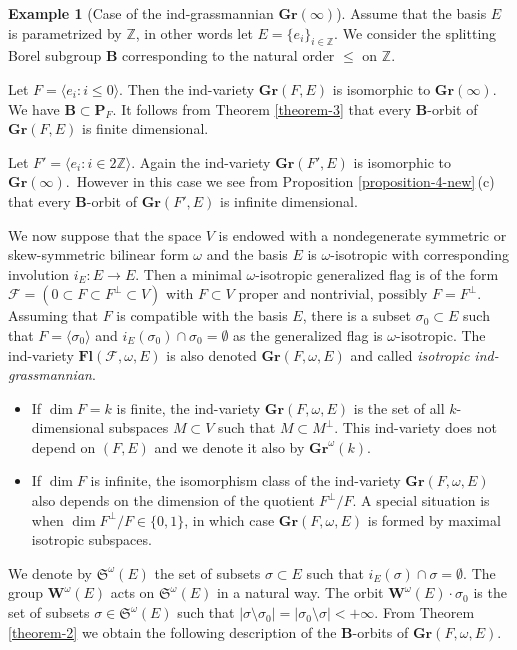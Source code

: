 \documentclass[12pt]{amsart}
\theoremstyle{definition}
\newtheorem{example}{Example}
\begin{document}
\begin{example}[Case of the ind-grassmannian $\mathbf{Gr}(\infty)$]

Assume that the basis $E$ is parametrized by $\mathbb{Z}$, in other words let $E=\{e_i\}_{i\in\mathbb{Z}}$. We consider the splitting Borel subgroup $\mathbf{B}$ corresponding to the natural order $\leq$ on $\mathbb{Z}$.

Let $F=\langle e_i:i\leq 0\rangle$. Then the ind-variety $\mathbf{Gr}(F,E)$ is isomorphic to $\mathbf{Gr}(\infty)$. We have $\mathbf{B}\subset\mathbf{P}_F$. It follows from Theorem \ref{theorem-3} that every $\mathbf{B}$-orbit of $\mathbf{Gr}(F,E)$ is finite dimensional.

Let $F'=\langle e_i:i\in 2\mathbb{Z}\rangle$. Again the ind-variety $\mathbf{Gr}(F',E)$ is isomorphic to $\mathbf{Gr}(\infty)$.\ However in this case we see from Proposition \ref{proposition-4-new}\,{\rm (c)} that every $\mathbf{B}$-orbit of $\mathbf{Gr}(F',E)$ is infinite dimensional.
\end{example}

We now suppose that the space $V$ is endowed with a nondegenerate symmetric or skew-symmetric bilinear form $\omega$ and the basis $E$ is $\omega$-isotropic with corresponding involution $i_E:E\to E$.
Then a minimal $\omega$-isotropic generalized flag is of the form $\mathcal{F}=(0\subset F\subset F^\perp\subset V)$ with $F\subset V$ proper and nontrivial, possibly $F=F^\perp$. Assuming that $F$ is compatible with the basis $E$, there is a subset $\sigma_0\subset E$ such that
$F=\langle \sigma_0\rangle$
and $i_E(\sigma_0)\cap\sigma_0=\emptyset$ as the generalized flag is $\omega$-isotropic.
The ind-variety $\mathbf{Fl}(\mathcal{F},\omega,E)$ is also denoted $\mathbf{Gr}(F,\omega,E)$ and called {\em isotropic ind-grassmannian}.
\begin{itemize}
\item If $\dim F=k$ is finite, the ind-variety $\mathbf{Gr}(F,\omega,E)$ is the set of all $k$-dimensional subspaces $M\subset V$ such that $M\subset M^\perp$. This ind-variety does not depend on $(F,E)$ and we denote it also by $\mathbf{Gr}^\omega(k)$.
\item If $\dim F$ is infinite, the isomorphism class of the ind-variety $\mathbf{Gr}(F,\omega,E)$ also depends on the dimension of the quotient $F^\perp/F$. A special situation is when $\dim F^\perp/F\in\{0,1\}$, in which case $\mathbf{Gr}(F,\omega,E)$ is formed by maximal isotropic subspaces.
\end{itemize}
We denote by $\mathfrak{S}^\omega(E)$ the set of subsets $\sigma\subset E$ such that $i_E(\sigma)\cap\sigma=\emptyset$. The group $\mathbf{W}^\omega(E)$  acts on $\mathfrak{S}^\omega(E)$ in a natural way. The orbit $\mathbf{W}^\omega(E)\cdot\sigma_0$ is the set of subsets $\sigma\in\mathfrak{S}^\omega(E)$ such that $|\sigma\setminus\sigma_0|=|\sigma_0\setminus\sigma|<+\infty$.
From Theorem \ref{theorem-2} we obtain the following description of the $\mathbf{B}$-orbits of $\mathbf{Gr}(F,\omega,E)$.
\end{document}
